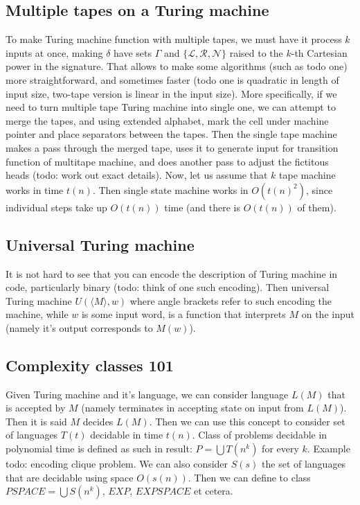 \documentclass[12pt]{article}
\begin{document}
\subsection{Multiple tapes on a Turing machine}
To make Turing machine function with multiple tapes, we must have it process \(k\) inputs at once, making \(\delta\) have sets \(\Gamma\) and \(\{\mathcal L,\mathcal R,\mathcal N\}\) raised to the \(k\)-th Cartesian power in the signature.
That allows to make some algorithms (such as todo one) more straightforward, and sometimes faster (todo one is quadratic in length of input size, two-tape version is linear in the input size). More specifically, if we need to turn multiple tape Turing machine into single one, we can attempt to merge the tapes, and using extended alphabet, mark the cell under machine pointer and place separators between the tapes. Then the single tape machine makes a pass through the merged tape, uses it to generate input for transition function of multitape machine, and does another pass to adjust the fictitous heads (todo: work out exact details). Now, let us assume that \(k\) tape machine works in time \(t(n)\). Then single state machine works in \(O(t(n)^2)\), since individual steps take up \(O(t(n))\) time (and there is \(O(t(n))\) of them).
\subsection{Universal Turing machine}
It is not hard to see that you can encode the description of Turing machine in code, particularly binary (todo: think of one such encoding). Then universal Turing machine \(U(\langle M\rangle, w)\) where angle brackets refer to such encoding the machine, while \(w\) is some input word, is a function that interprets \(M\) on the input (namely it's output corresponds to \(M(w)\)).
\subsection{Complexity classes 101}
Given Turing machine and it's language, we can consider language \(L(M)\) that is accepted by \(M\) (namely terminates in accepting state on input from \(L(M)\)). Then it is said \(M\) decides \(L(M)\). Then we can use this concept to consider set of languages \(T(t)\) decidable in time \(t(n)\). Class of problems decidable in polynomial time is defined as such in result: \(P=\bigcup T(n^k)\) for every \(k\). Example todo: encoding clique problem. We can also consider \(S(s)\) the set of languages that are decidable using space \(O(s(n))\). Then we can define to class \(PSPACE = \bigcup S(n^k)\), \(EXP\), \(EXPSPACE\) et cetera.
\end{document}
